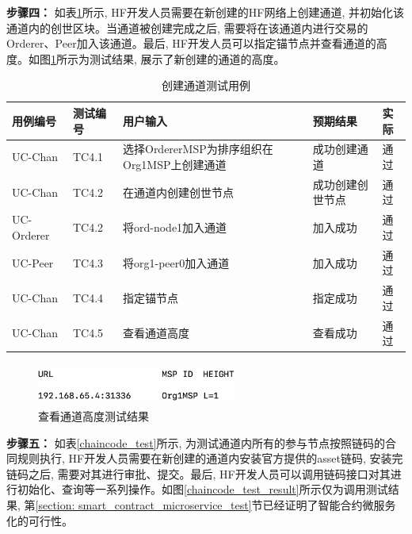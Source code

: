 \textbf{步骤四：} 如表\ref{channel_test}所示, HF开发人员需要在新创建的HF网络上创建通道, 并初始化该通道内的创世区块。当通道被创建完成之后, 需要将在该通道内进行交易的Orderer、Peer加入该通道。最后, HF开发人员可以指定锚节点并查看通道的高度。如图\ref{channel_test_result}所示为测试结果, 展示了新创建的通道的高度。

{\footnotesize
\begin{longtable}[h]{m{45pt} m{45pt} m{180pt} m{50pt} m{20pt}}
    \caption[创建通道测试用例]{创建通道测试用例} \label{channel_test}\\
        \toprule  
        \textbf{用例编号}&\textbf{测试编号}&\textbf{用户输入}&\textbf{预期结果}&\textbf{实际}\\
        \hline
        UC-Chan & TC4.1 & 选择OrdererMSP为排序组织在Org1MSP上创建通道 & 成功创建通道 & 通过 \\
        \hline
        UC-Chan & TC4.2 & 在通道内创建创世节点 & 成功创建创世节点 & 通过 \\
        \hline
        UC-Orderer & TC4.2 & 将ord-node1加入通道 & 加入成功 & 通过 \\
        \hline
        UC-Peer & TC4.3 & 将org1-peer0加入通道 & 加入成功 & 通过 \\
        \hline
        UC-Chan & TC4.4 & 指定锚节点 & 指定成功 & 通过 \\
        \hline
        UC-Chan & TC4.5 & 查看通道高度 & 查看成功 & 通过 \\
        \bottomrule
    \end{longtable} 
}

\begin{figure}[h] %
    \centering %
    \includegraphics[width=0.6\textwidth]{FIGs/chapter6/channel.png} %
    \caption{查看通道高度测试结果} %
    \label{channel_test_result} %
\end{figure}%

\textbf{步骤五：} 如表\ref{chaincode_test}所示, 为测试通道内所有的参与节点按照链码的合同规则执行, HF开发人员需要在新创建的通道内安装官方提供的asset\footnotemark[1]链码, 安装完链码之后, 需要对其进行审批、提交。最后, HF开发人员可以调用链码接口对其进行初始化、查询等一系列操作。如图\ref{chaincode_test_result}所示仅为调用测试结果, 第\ref{section: smart_contract_microservice_test}节已经证明了智能合约微服务化的可行性。

